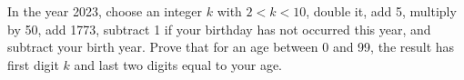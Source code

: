 In the year 2023, choose an integer $k$ with $2<k<10$, double it, add 5, multiply by 50, add 1773, subtract 1 if your birthday has not occurred this year, and subtract your birth year. Prove that for an age between 0 and 99, the result has first digit $k$ and last two digits equal to your age.

